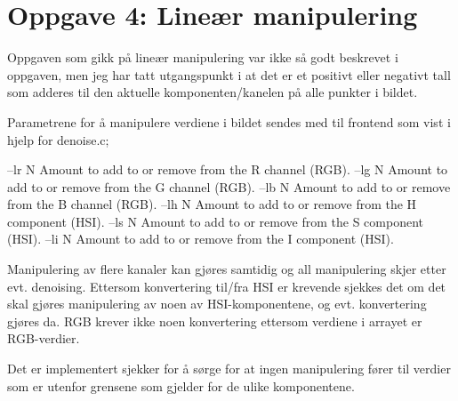 \section*{Oppgave 4: Lineær manipulering}

Oppgaven som gikk på lineær manipulering var ikke så godt beskrevet i oppgaven, men jeg har tatt utgangspunkt i at det er et positivt eller negativt tall som adderes til den aktuelle komponenten/kanelen på alle punkter i bildet.

Parametrene for å manipulere verdiene i bildet sendes med til frontend som vist i hjelp for denoise.c;

--lr N  Amount to add to or remove from the R channel (RGB).
--lg N  Amount to add to or remove from the G channel (RGB).
--lb N  Amount to add to or remove from the B channel (RGB).
--lh N  Amount to add to or remove from the H component (HSI).
--ls N  Amount to add to or remove from the S component (HSI).
--li N  Amount to add to or remove from the I component (HSI).

Manipulering av flere kanaler kan gjøres samtidig og all manipulering skjer etter evt. denoising. Ettersom konvertering til/fra HSI er krevende sjekkes det om det skal gjøres manipulering av noen av HSI-komponentene, og evt. konvertering gjøres da. RGB krever ikke noen konvertering ettersom verdiene i arrayet er RGB-verdier.

Det er implementert sjekker for å sørge for at ingen manipulering fører til verdier som er utenfor grensene som gjelder for de ulike komponentene.